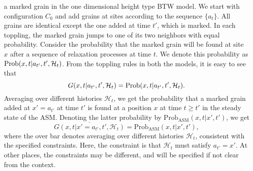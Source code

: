 \documentclass[11pt,a4paper]{book}
\begin{document}
a marked grain in the one dimensional height type BTW model. We start 
with configuration $C_0$ and add grains at sites according to the 
sequence $\{a_t\}$. All grains are identical except the one added at 
time $t'$, which is marked. In each toppling, the marked grain jumps to 
one of its two neighbors with equal probability. Consider the 
probability that the marked grain will be found at site $x$ after a 
sequence of relaxation processes at time $t$. We denote this probability as 
${\rm Prob}(x,t|a_{t'},t',\mathcal{H}_t)$. From the toppling rules in 
both the models, it is easy to see that 
\begin{equation}
 G(x,t|a_{t'},t',\mathcal{H}_t) = {\rm Prob}(x,t|a_{t'},t',\mathcal{H}_t).
\end{equation}
Averaging over different histories $\mathcal{H}_t$, we get the probability 
that a marked grain added at $x'=a_{t'}$ at time $t'$  is found at a 
position $x$ at time $t \ge t'$ in the steady state of the ASM.
Denoting the latter probability by $\mathrm{Prob_{ASM}}(x,t| x',t')$, we get
\begin{equation}
  \label{eq:5}
\overline{ G(x,t|x'=a_{t'},t',\mathcal{H}_t)} = 
\mathrm{Prob_{ASM}}(x,t|x',t'),
\end{equation}
where the over bar denotes averaging over  different 
histories $\mathcal{H}_t$, consistent with the specified constraints. 
Here, 
the constraint is that $\mathcal{H}_t$ must satisfy  $a_{t'} = x'$. At 
other places, the constraints may be different, and will be  specified  
if not clear from the context.
\end{document}
